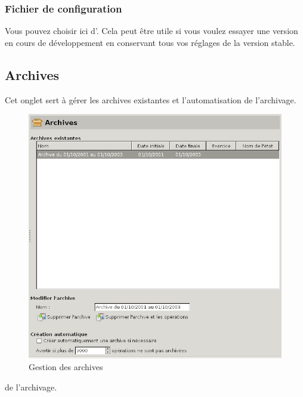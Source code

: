 \ifIllustration
\else
\newpage
\fi


\subsubsection{Fichier de configuration\label{setup-general-files-config}}

Vous pouvez choisir ici d'. Cela peut être utile si vous voulez essayer une version en cours de développement en conservant tous vos réglages de la version stable.


\subsection{Archives\label{setup-general-archives}}

Cet onglet sert à gérer les archives existantes et l'automatisation \ifIllustration de l'archivage.
\begin{figure}[htb]
\begin{center}
\includegraphics[scale=0.50]{image/screenshot/setup_history}
\end{center}
\caption{Gestion des archives}
\label{setup-history-img}
\end{figure}
\else de l'archivage.
\fi


